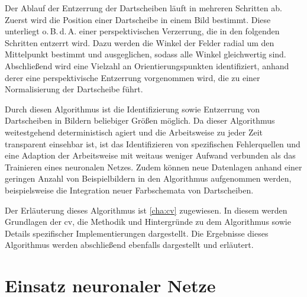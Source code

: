 Der Ablauf der Entzerrung der Dartscheiben läuft in mehreren Schritten ab. Zuerst wird die Position einer Dartscheibe in einem Bild bestimmt. Diese unterliegt o.\,B.\,d.\,A. einer perspektivischen Verzerrung, die in den folgenden Schritten entzerrt wird. Dazu werden die Winkel der Felder radial um den Mittelpunkt bestimmt und ausgeglichen, sodass alle Winkel gleichwertig sind. Abschließend wird eine Vielzahl an Orientierungspunkten identifiziert, anhand derer eine perspektivische Entzerrung vorgenommen wird, die zu einer Normalisierung der Dartscheibe führt.

Durch diesen Algorithmus ist die Identifizierung sowie Entzerrung von Dartscheiben in Bildern beliebiger Größen möglich. Da dieser Algorithmus weitestgehend deterministisch agiert und die Arbeitsweise zu jeder Zeit transparent einsehbar ist, ist das Identifizieren von spezifischen Fehlerquellen und eine Adaption der Arbeitsweise mit weitaus weniger Aufwand verbunden als das Trainieren eines neuronalen Netzes. Zudem können neue Datenlagen anhand einer geringen Anzahl von Beispielbildern in den Algorithmus aufgenommen werden, beispielsweise die Integration neuer Farbschemata von Dartscheiben.

Der Erläuterung dieses Algorithmus ist \autoref{cha:cv} zugewiesen. In diesem werden Grundlagen der \ac{cv}, die Methodik und Hintergründe zu dem Algorithmus sowie Details spezifischer Implementierungen dargestellt. Die Ergebnisse dieses Algorithmus werden abschließend ebenfalls dargestellt und erläutert.



\section{Einsatz neuronaler Netze}
\label{sec:einsatz_nn}

